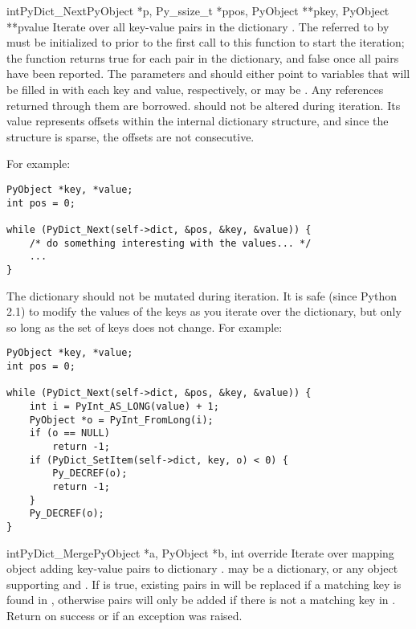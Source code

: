 \begin{cfuncdesc}{int}{PyDict_Next}{PyObject *p, Py_ssize_t *ppos,
                                    PyObject **pkey, PyObject **pvalue}
  Iterate over all key-value pairs in the dictionary .  The
   referred to by  must be initialized to
   prior to the first call to this function to start the
  iteration; the function returns true for each pair in the
  dictionary, and false once all pairs have been reported.  The
  parameters  and  should either point to
   variables that will be filled in with each key and
  value, respectively, or may be \NULL{}.  Any references returned through
  them are borrowed.   should not be altered during iteration.
  Its value represents offsets within the internal dictionary structure,
  and since the structure is sparse, the offsets are not consecutive.

  For example:

\begin{verbatim}
PyObject *key, *value;
int pos = 0;

while (PyDict_Next(self->dict, &pos, &key, &value)) {
    /* do something interesting with the values... */
    ...
}
\end{verbatim}

  The dictionary  should not be mutated during iteration.  It
  is safe (since Python 2.1) to modify the values of the keys as you
  iterate over the dictionary, but only so long as the set of keys
  does not change.  For example:

\begin{verbatim}
PyObject *key, *value;
int pos = 0;

while (PyDict_Next(self->dict, &pos, &key, &value)) {
    int i = PyInt_AS_LONG(value) + 1;
    PyObject *o = PyInt_FromLong(i);
    if (o == NULL)
        return -1;
    if (PyDict_SetItem(self->dict, key, o) < 0) {
        Py_DECREF(o);
        return -1;
    }
    Py_DECREF(o);
}
\end{verbatim}
\end{cfuncdesc}

\begin{cfuncdesc}{int}{PyDict_Merge}{PyObject *a, PyObject *b, int override}
  Iterate over mapping object  adding key-value pairs to dictionary
  .
   may be a dictionary, or any object supporting
   and .
  If  is true, existing pairs in  will
  be replaced if a matching key is found in , otherwise pairs
  will only be added if there is not a matching key in .
  Return  on success or  if an exception was
  raised.
\end{cfuncdesc}

